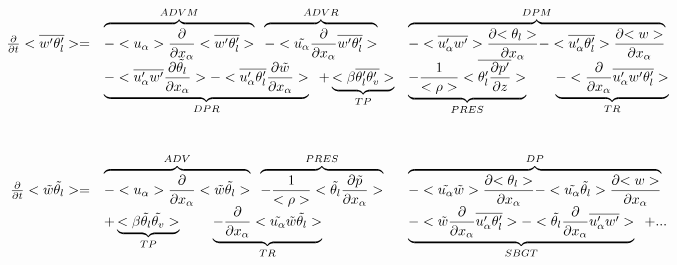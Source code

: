\begin{displaymath}
\left.
\begin{array}{rllll}
\frac{\partial }{\partial t} <\overline{w'\theta_l'}> = & 
\overbrace{- <u_\alpha>\frac{\partial}{\partial x_\alpha} <\overline{w'\theta_l'}> }^{ADVM} \;\;
\overbrace{- <\tilde{u_\alpha}\frac{\partial}{\partial x_\alpha} \overline{w'\theta_l'} > }^{ADVR} &
\overbrace{- <\overline{u_\alpha'w'}> \frac{\partial {<\theta_l>}}{\partial x_\alpha}
- <\overline{u'_\alpha \theta_l'}> \frac{\partial {<w>}}{\partial x_\alpha}}^{DPM} \\
\vspace*{1.0cm}
& \underbrace{- <\overline{u'_\alpha w'} \frac{\partial {\tilde{\theta_l}}}{\partial x_\alpha}>
- <\overline{u'_\alpha \theta_l'} \frac{\partial {\tilde{w}}}{\partial x_\alpha}>}_{DPR} \;\;
+ \underbrace{<\beta  \overline{\theta_l'\theta'_v}>}_{TP} &
\underbrace{- \frac{1}{<\rho>}<\overline{\theta_l' \frac{\partial p'}{\partial z}}>}_{PRES} \;\;\;\;\;\;\;
 \underbrace{- <\frac{\partial}{\partial x_\alpha} \overline{u'_\alpha w'\theta_l'}>}_{TR} \\
\frac{\partial }{\partial t} <\tilde{w}\tilde{\theta_l}> = & 
\overbrace{- <u_\alpha>\frac{\partial}{\partial x_\alpha} <\tilde{w}\tilde{\theta_l}> }^{ADV} \;\;
\overbrace{- \frac{1}{<\rho>}<\tilde{\theta_l} \frac{\partial \tilde{p}}{\partial x_\alpha}>}^{PRES} &
\overbrace{- <\tilde{u_\alpha} \tilde{w}> \frac{\partial {<\theta_l>}}{\partial x_\alpha}
- <\tilde{u_\alpha} \tilde{\theta_l}> \frac{\partial {<w>}}{\partial x_\alpha}}^{DP} &\\
&+ \underbrace{<\beta  \tilde{\theta_l}\tilde{\theta_v}>}_{TP} \;\;\;\;\;\;\;\;
 \underbrace{- \frac{\partial}{\partial x_\alpha} <\tilde{u_\alpha} \tilde{w}\tilde{\theta_l}>}_{TR} &
\underbrace{- <\tilde{w}\frac{\partial}{\partial x_\alpha}\overline{u'_\alpha \theta_l'}>
- <\tilde{\theta_l}\frac{\partial}{\partial x_\alpha}\overline{u'_\alpha w'}>}_{SBGT}\hspace{0.2cm} + ...&
\end{array}
\right.
\end{displaymath}


